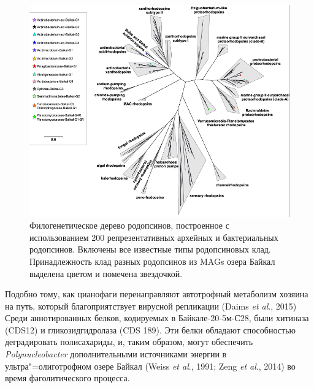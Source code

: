 \documentclass[a4paper,12pt,openany,final]{extreport}
\newcommand\MA[2]{{\sffamily\color{red}\hsmash{$\uparrow$}%
  \smash{\toplap{#1}{\scriptsize\bfseries #2}}}}
\def\oldcaption{} \let\oldcaption=\caption
\def\caption{\stepcounter{captionsnum}\oldcaption}
\renewcommand\MA[2]{}
\begin{document}
\begin{figure}\centering
\includegraphics[width=\linewidth]{media/image10.png}

\caption{Филогенетическое дерево родопсинов, построенное с использованием 200 репрезентативных архейных и бактериальных родопсинов.  Включены все известные типы родопсиновых клад. Принадлежность клад разных родопсинов из MAGs озера Байкал выделена цветом и помечена звездочкой.}\label{fig:4-5}
\end{figure}

Подобно тому, как цианофаги перенаправляют автотрофный метаболизм хозяина на путь, который благоприятствует вирусной репликации (Daims \textit{et al}., 2015)\MA{r}{конец предложения.} Среди аннотированных белков, кодируемых в Байкале-20-5м-С28, были хитиназа (CDS12) и гликозидгидролаза (CDS 189).  Эти белки обладают способностью деградировать полисахариды, и, таким образом, могут обеспечить \emph{Polynucleobacter} дополнительными источниками энергии в ультра"=олиготрофном озере Байкал (Weiss \textit{et al}., 1991; Zeng \textit{et al}., 2014) во время фаголитического процесса.
\end{document}
